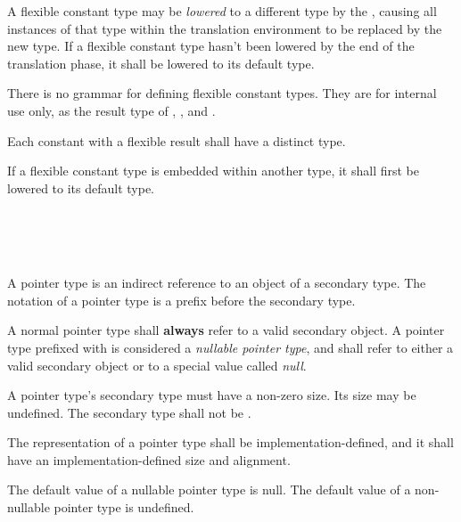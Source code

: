 \specsubsubitem
A flexible constant type may be \textit{lowered} to a different type by the
, causing all instances of that
type within the translation environment to be replaced by the new type. If a
flexible constant type hasn't been lowered by the end of the translation phase,
it shall be lowered to its default type.

\specsubsubitem
There is no grammar for defining flexible constant types. They are for internal
use only, as the result type of ,
, and .

\specsubsubitem
Each constant with a flexible result shall have a distinct type.

\specsubsubitem
If a flexible constant type is embedded within another type, it shall first be
lowered to its default type.



\begin{grammar}
 \\
	\terminal{*}  \\
	 \terminal{*}  \\
\end{grammar}

\specsubsubitem
A pointer type is an indirect reference to an object of a secondary type. The
notation of a pointer type is a \terminal{*} prefix before the secondary type.

\specsubsubitem
A normal pointer type shall \textbf{always} refer to a valid secondary object.
A pointer type prefixed with  is considered a
\textit{nullable pointer type}, and shall refer to either a valid secondary object
or to a special value called \textit{null}.

\specsubsubitem
A pointer type's secondary type must have a non-zero size. Its size may be
undefined. The secondary type shall not be .

\specsubsubitem
The representation of a pointer type shall be implementation-defined, and it
shall have an implementation-defined size and alignment.

\specsubsubitem
The default value of a nullable pointer type is null. The default value of a
non-nullable pointer type is undefined.

